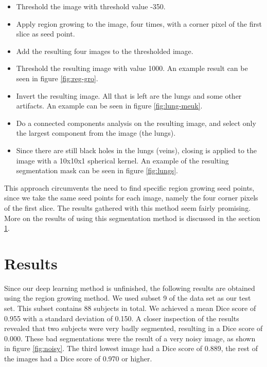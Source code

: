 \documentclass[a4paper,10pt]{article}
\numberwithin{equation}{section} %
\numberwithin{figure}{section} %
\numberwithin{table}{section} %
\begin{document}
\begin{itemize}
\item Threshold the image with threshold value -350.
\item Apply region growing to the image, four times, with a corner pixel of the first slice as seed point.
\item Add the resulting four images to the thresholded image.
\item Threshold the resulting image with value 1000. An example result can be seen in figure \ref{fig:reg-gro}.
\item Invert the resulting image. All that is left are the lungs and some other artifacts. An example can be seen in figure \ref{fig:lung-meuk}.
\item Do a connected components analysis on the resulting image, and select only the largest component from the image (the lungs).
\item Since there are still black holes in the lungs (veins), closing is applied to the image with a 10x10x1 spherical kernel. An example of the resulting segmentation mask can be seen in figure \ref{fig:lungs}.
\end{itemize}

\noindent This approach circumvents the need to find specific region growing seed points, since we take the same seed points for each image, namely the four corner pixels of the first slice. The results gathered with this method seem fairly promising. More on the results of using this segmentation method is discussed in the section \ref{sec:results}.


\section{Results}
\label{sec:results}
Since our deep learning method is unfinished, the following results are obtained using the region growing method. We used subset 9 of the data set as our test set. This subset contains 88 subjects in total. We achieved a mean Dice score of 0.955 with a standard deviation of 0.150. A closer inspection of the results revealed that two subjects were very badly segmented, resulting in a Dice score of 0.000. These bad segmentations were the result of a very noisy image, as shown in figure \ref{fig:noisy}. The third lowest image had a Dice score of 0.889, the rest of the images had a Dice score of 0.970 or higher. 
\end{document}
